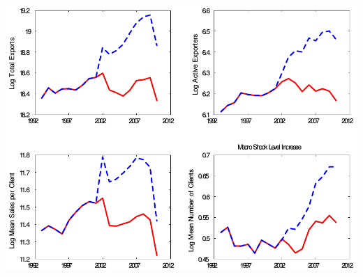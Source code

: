 \documentclass[notes=show]{beamer}
\begin{document}
\begin{frame}%


\begin{center}
    \includegraphics[scale=0.3]{figs/increase_in_foreign_market_size.png}
\end{center}

\end{frame}%
\end{document}
